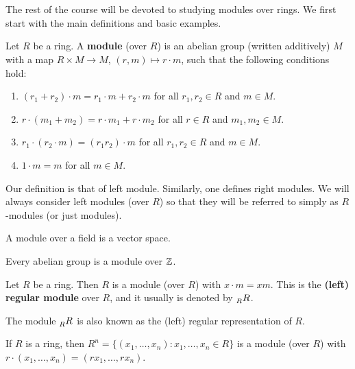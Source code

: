 \chapter{}


The rest of the course will be devoted to studying modules over rings. 
We first start with the main definitions and basic examples.

\begin{definition}
    Let $R$ be a ring. A \textbf{module} (over $R$) is an abelian group (written additively) 
    $M$ with a map $R\times M\to M$, $(r,m)\mapsto r\cdot m$, such that
    the following conditions hold:
    \begin{enumerate}
        \item $(r_1+r_2)\cdot m=r_1\cdot m+r_2\cdot m$ for all $r_1,r_2\in R$ and $m\in M$.
		\item $r\cdot (m_1+m_2)=r\cdot m_1+r\cdot m_2$ for all $r\in R$ and $m_1,m_2\in M$.
		\item $r_1\cdot (r_2\cdot m)=(r_1r_2)\cdot m$ for all $r_1,r_2\in R$ and $m\in M$.
		\item $1\cdot m=m$ for all $m\in M$.	
    \end{enumerate}
\end{definition}

Our definition is that of left module. Similarly, one defines right modules. We will always
consider left modules (over $R$) 
so that they will be referred to simply as $R$-modules (or just modules).

\begin{example}
A module over a field is a vector space. 
\end{example}

\begin{example}
Every abelian group is a module over $\mathbb{Z}$.	
\end{example}

\begin{example}
\label{exa:left_regular}
Let $R$ be a ring. Then $R$ is a module (over $R$) with $x\cdot m=xm$. 
This is the \textbf{(left) regular module} over $R$, and it usually 
is denoted by $\prescript{}{R}R$. 
\end{example}

The module $\prescript{}{R}R$ is also known as the (left) regular representation of $R$. 

\begin{example}
If $R$ is a ring, then $R^n=\{(x_1,\dots,x_n):x_1,\dots,x_n\in R\}$ 
is a module (over $R$) with  
$r\cdot (x_1,\dots,x_n)=(rx_1,\dots,rx_n)$. 
\end{example}


